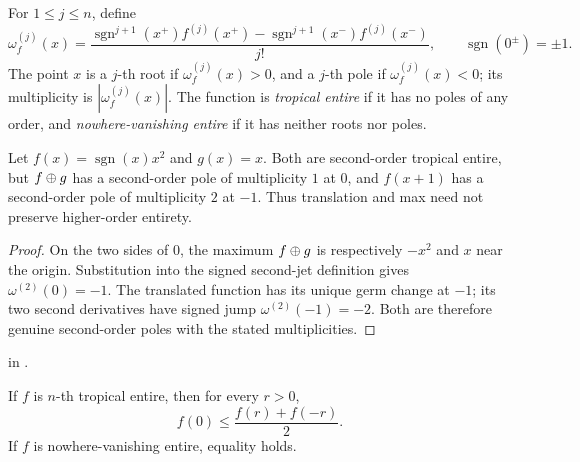 \begin{definition}
\leanok
{}
For $1\leq j\leq n$, define
\[
 \omega_f^{(j)}(x)=
 \frac{\operatorname{sgn}^{j+1}(x^+)f^{(j)}(x^+)
 -\operatorname{sgn}^{j+1}(x^-)f^{(j)}(x^-)}{j!},
 \qquad \operatorname{sgn}(0^\pm)=\pm1.
\]
The point $x$ is a $j$-th root if $\omega_f^{(j)}(x)>0$, and a $j$-th
pole if $\omega_f^{(j)}(x)<0$; its multiplicity is
$|\omega_f^{(j)}(x)|$.  The function is \emph{tropical entire} if it has no
poles of any order, and \emph{nowhere-vanishing entire} if it has neither
roots nor poles.
\end{definition}

\begin{example}
\leanok
{}
Let $f(x)=\operatorname{sgn}(x)x^2$ and $g(x)=x$.  Both are second-order
tropical entire, but $f\mathbin{\oplus} g$ has a second-order pole of multiplicity
$1$ at $0$, and $f(x+1)$ has a second-order pole of multiplicity $2$ at
$-1$.  Thus translation and max need not preserve higher-order entirety.
\end{example}

\begin{proof}
\leanok
On the two sides of $0$, the maximum $f\mathbin{\oplus} g$ is respectively $-x^2$
and $x$ near the origin.  Substitution into the signed second-jet definition
gives $\omega^{(2)}(0)=-1$.  The translated function has its unique germ
change at $-1$; its two second derivatives have signed jump
$\omega^{(2)}(-1)=-2$.  Both are therefore genuine second-order poles with
the stated multiplicities.
\end{proof}

\begin{leanproof}
 in .
\end{leanproof}

\begin{proposition}
\leanok
{}
If $f$ is $n$-th tropical entire, then for every $r>0$,
\[
                    f(0)\leq\frac{f(r)+f(-r)}2.
\]
If $f$ is nowhere-vanishing entire, equality holds.
\end{proposition}

